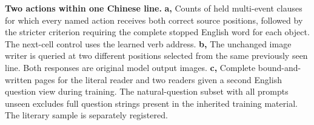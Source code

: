 \textbf{Two actions within one Chinese line.} \textbf{a,} Counts of held multi-event clauses for which every named action receives both correct source positions, followed by the stricter criterion requiring the complete stopped English word for each object. The next-cell control uses the learned verb address. \textbf{b,} The unchanged image writer is queried at two different positions selected from the same previously seen line. Both responses are original model output images. \textbf{c,} Complete bound-and-written pages for the literal reader and two readers given a second English question view during training. The natural-question subset with all prompts unseen excludes full question strings present in the inherited training material. The literary sample is separately registered.
